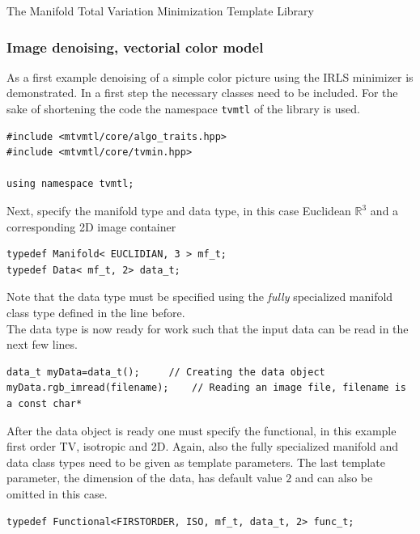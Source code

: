 \begin{chapter}{The Manifold Total Variation Minimization Template Library}
\subsubsection{Image denoising, vectorial color model} %
\label{ssub:Image denoising, vectorial color model}
As a first example denoising of a simple color picture using the IRLS minimizer is demonstrated. In a first step the necessary classes need to be included. For the sake of shortening the 
code the namespace \texttt{tvmtl} of the library is used. \\
\cppinline
\begin{lstlisting}[label=code:tut_include,caption={Inclusion of library headers}]
#include <mtvmtl/core/algo_traits.hpp>
#include <mtvmtl/core/tvmin.hpp>

using namespace tvmtl;
\end{lstlisting}

Next, specify the manifold type and data type, in this case Euclidean $\mathbb{R}^3$ and a corresponding 2D image container\\

\cppinline
\begin{lstlisting}[label=code:tut_typedef,caption={Specification of manifold and data type}]
typedef Manifold< EUCLIDIAN, 3 > mf_t;
typedef Data< mf_t, 2> data_t;
\end{lstlisting}

Note that the data type must be specified using the \textit{fully} specialized manifold class type defined in the line before.\\
The data type is now ready for work such that the input data can be read in the next few lines.\\

\cppinline
\begin{lstlisting}[label=code:tut_data,caption={Initialization and input of image data}]
data_t myData=data_t();		// Creating the data object
myData.rgb_imread(filename);	// Reading an image file, filename is a const char*
\end{lstlisting}

After the data object is ready one must specify the functional, in this example first order TV, isotropic and 2D. Again,
also the fully specialized manifold and data class types need to be given as template parameters. The last template parameter, the dimension of the data, 
has default value $2$ and can also be omitted in this case.\\

\cppinline
\begin{lstlisting}[label=code:tut_func,caption={Defining the functional and setting parameters}]
typedef Functional<FIRSTORDER, ISO, mf_t, data_t, 2> func_t;


\end{lstlisting}
\end{chapter}
